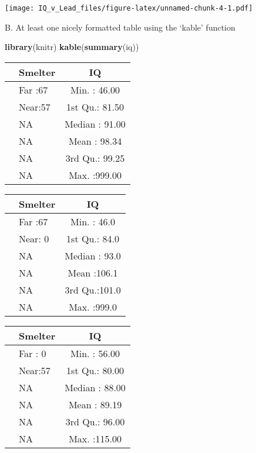 \documentclass[]{article}
\newenvironment{Shaded}{\begin{snugshade}}{\end{snugshade}}
\newcommand{\KeywordTok}[1]{\textcolor[rgb]{0.13,0.29,0.53}{\textbf{#1}}}
\newcommand{\StringTok}[1]{\textcolor[rgb]{0.31,0.60,0.02}{#1}}
\newcommand{\OperatorTok}[1]{\textcolor[rgb]{0.81,0.36,0.00}{\textbf{#1}}}
\newcommand{\NormalTok}[1]{#1}
\begin{document}
\texttt{[image: IQ\_v\_Lead\_files/figure-latex/unnamed-chunk-4-1.pdf]}

B. At least one nicely formatted table using the `kable' function

\begin{Shaded}
\begin{Highlighting}[]
\KeywordTok{library}\NormalTok{(knitr)}
\KeywordTok{kable}\NormalTok{(}\KeywordTok{summary}\NormalTok{(iq))}
\end{Highlighting}
\end{Shaded}

\begin{longtable}[]{@{}llc@{}}
\toprule
& Smelter & IQ\tabularnewline
\midrule
\endhead
& Far :67 & Min. : 46.00\tabularnewline
& Near:57 & 1st Qu.: 81.50\tabularnewline
& NA & Median : 91.00\tabularnewline
& NA & Mean : 98.34\tabularnewline
& NA & 3rd Qu.: 99.25\tabularnewline
& NA & Max. :999.00\tabularnewline
\bottomrule
\end{longtable}

\begin{Shaded}
\end{Shaded}

\begin{longtable}[]{@{}llc@{}}
\toprule
& Smelter & IQ\tabularnewline
\midrule
\endhead
& Far :67 & Min. : 46.0\tabularnewline
& Near: 0 & 1st Qu.: 84.0\tabularnewline
& NA & Median : 93.0\tabularnewline
& NA & Mean :106.1\tabularnewline
& NA & 3rd Qu.:101.0\tabularnewline
& NA & Max. :999.0\tabularnewline
\bottomrule
\end{longtable}

\begin{Shaded}
\end{Shaded}

\begin{longtable}[]{@{}llc@{}}
\toprule
& Smelter & IQ\tabularnewline
\midrule
\endhead
& Far : 0 & Min. : 56.00\tabularnewline
& Near:57 & 1st Qu.: 80.00\tabularnewline
& NA & Median : 88.00\tabularnewline
& NA & Mean : 89.19\tabularnewline
& NA & 3rd Qu.: 96.00\tabularnewline
& NA & Max. :115.00\tabularnewline
\bottomrule
\end{longtable}
\end{document}
